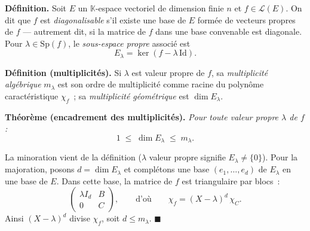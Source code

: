 


\begin{tcolorbox}[thmbox]
  \textbf{Définition.}\enspace%
  Soit $E$ un $\mathbb{K}$-espace vectoriel de dimension finie $n$ et
  $f \in \mathcal{L}(E)$. On dit que $f$ est \emph{diagonalisable} s'il
  existe une base de $E$ formée de vecteurs propres de $f$ — autrement dit,
  si la matrice de $f$ dans une base convenable est diagonale.
  Pour $\lambda \in \mathrm{Sp}(f)$, le \emph{sous-espace propre} associé est
  \[
    E_\lambda = \ker(f - \lambda\,\mathrm{Id}).
  \]

  \medskip
  \textbf{Définition (multiplicités).}\enspace%
  Si $\lambda$ est valeur propre de $f$, sa \emph{multiplicité algébrique}
  $m_\lambda$ est son ordre de multiplicité comme racine du polynôme
  caractéristique $\chi_f$~; sa \emph{multiplicité géométrique} est
  $\dim E_\lambda$.

  \medskip
  \textbf{Théorème (encadrement des multiplicités).}\enspace%
  \textit{Pour toute valeur propre $\lambda$ de $f$ :}
  \[
    1 \;\leq\; \dim E_\lambda \;\leq\; m_\lambda.
  \]
\end{tcolorbox}

\begin{mdframed}[style=proofbar]
  La minoration vient de la définition ($\lambda$ valeur propre signifie
  $E_\lambda \neq \{0\}$). Pour la majoration, posons $d = \dim E_\lambda$
  et complétons une base $(e_1,\ldots,e_d)$ de $E_\lambda$ en une base de
  $E$. Dans cette base, la matrice de $f$ est triangulaire par blocs~:
  \[
    \begin{pmatrix} \lambda I_d & B \\ 0 & C \end{pmatrix},
    \qquad\text{d'où}\qquad
    \chi_f = {(X-\lambda)}^{d}\,\chi_C.
  \]
  Ainsi ${(X-\lambda)}^{d}$ divise $\chi_f$, soit $d \leq m_\lambda$.
  \hfill$\blacksquare$
\end{mdframed}

